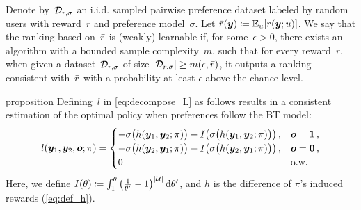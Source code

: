 \begin{definition}[Learnability]
\label{def:learnability}
Denote by~${\mathcal{D}}_{r, \sigma}$ an i.i.d. sampled pairwise preference dataset labeled by random users with reward~$r$ and preference model~$\sigma$. Let ${\bar{r}}({\bm{y}}) \coloneqq \mathbb{E}_u[r({\bm{y}}; u)]$. We say that the ranking based on~${\bar{r}}$ is (weakly) learnable if, for some~$\epsilon > 0$, there exists an algorithm with a bounded sample complexity~$m$, such that for every reward~$r$, when given a dataset~${\mathcal{D}}_{r,\sigma}$ of size $|{\mathcal{D}}_{r,\sigma}| \ge m(\epsilon, {\bar{r}})$, it outputs a ranking consistent with~${\bar{r}}$ with a probability at least $\epsilon$ above the chance level.
\end{definition}

\begin{theoremEnd}[restate]{proposition}
\label{prop:consistent_loss_2}
Defining~$l$ in \cref{eq:decompose_L} as follows results in a consistent estimation of the optimal policy when preferences follow the BT model:
%
\begin{equation*}
    l({\bm{y}}_1, {\bm{y}}_2, {\bm{o}}; \pi) = \begin{cases}
        -\sigma\big(h({\bm{y}}_1, {\bm{y}}_2; \pi)\big) - I\big(\sigma\big(h({\bm{y}}_1, {\bm{y}}_2; \pi)\big)\big) \,, & {\bm{o}} = {\bm{1}} \,, \\
        -\sigma\big(h({\bm{y}}_2, {\bm{y}}_1; \pi)\big) - I\big(\sigma\big(h({\bm{y}}_2, {\bm{y}}_1; \pi)\big)\big) \,, & {\bm{o}} = {\bm{0}} \,, \\
        0 & \text{o.w.}
    \end{cases}
\end{equation*}
%
Here, we define $I(\theta) \coloneqq \int_1^\theta \big(\frac{1}{\theta'} - 1\big)^{|{\mathcal{U}}|} \mathop{}\!\mathrm{d} \theta'$, and $h$ is the difference of $\pi$'s induced rewards (\cref{eq:def_h}).
\end{theoremEnd}
